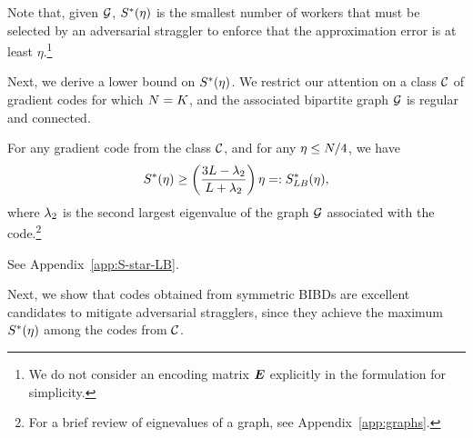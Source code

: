 \documentclass[conference,letterpaper]{IEEEtran}
\begin{document}
Note that, given $\mathcal{G}$, $S^{*}(\eta)$ is the smallest number of workers that must be selected by an adversarial straggler to enforce that the approximation error is at least $\eta$.\footnote{We do not consider an encoding matrix $\boldsymbol{E}$ explicitly in the formulation for simplicity.}

Next, we derive a lower bound on $S^{*}(\eta)$.
We restrict our attention on a class $\mathcal{C}$  of gradient codes for which $N = K$, and the associated bipartite graph $\mathcal{G}$ is regular and connected. 

\begin{proposition}
\label{prop:S-star-LB}
For any gradient code from the class $\mathcal{C}$, and for any $\eta \leq N/4$, we have
\begin{equation}
\label{eq:S-star-LB}
S^{*}(\eta) \geq \left(\frac{3L - \lambda_2}{L + \lambda_2}\right) \eta =: S^{*}_{LB}(\eta),
\end{equation}
where $\lambda_2$ is the second largest eigenvalue of the graph $\mathcal{G}$ associated with the code.\footnote{For a brief review of eignevalues of a graph, see Appendix~\ref{app:graphs}.}
\end{proposition}
\begin{IEEEproof}
See Appendix~\ref{app:S-star-LB}.
\end{IEEEproof}

Next, we show that codes obtained from symmetric BIBDs are 
{excellent candidates to mitigate adversarial stragglers}, since they achieve the maximum $S^{*}(\eta)$ among the codes from $\mathcal{C}$.
\end{document}
